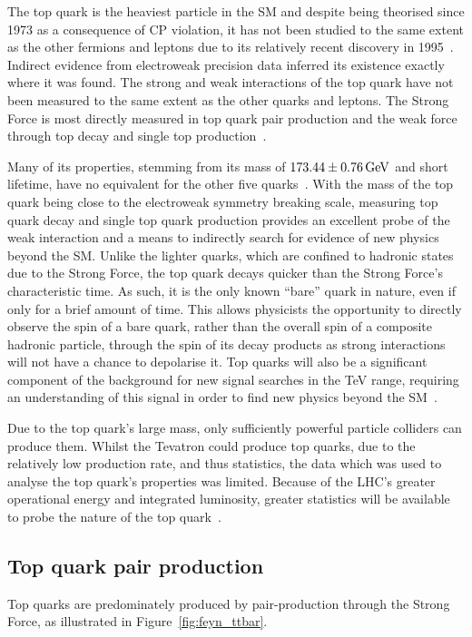 The top quark is the heaviest particle in the SM and despite being theorised since 1973 as a consequence of CP violation, it has not been studied to the same extent as the other fermions and leptons due to its relatively recent discovery in 1995~\cite{Quadt}. 
Indirect evidence from electroweak precision data inferred its existence exactly where it was found. 
The strong and weak interactions of the top quark have not been measured to the same extent as the other quarks and leptons.
The Strong Force is most directly measured in top quark pair production and the weak force through top decay and single top production~\cite{Quadt}. 

Many of its properties, stemming from its mass  of $173.44 \pm 0.76 \,\text{Ge\hspace{-.08em}V}$ and short lifetime, have no equivalent for the other five quarks~\cite{LHC:2014combination}. 
With the mass of the top quark being close to the electroweak symmetry breaking scale, measuring top quark decay and single top quark production provides an excellent probe of the weak interaction and a means to indirectly search for evidence of new physics beyond the SM. 
Unlike the lighter quarks, which are confined to hadronic states due to the Strong Force, the top quark decays quicker than the Strong Force's characteristic time.
As such, it is the only known ``bare'' quark in nature, even if only for a brief amount of time. 
This allows physicists the opportunity to directly observe the spin of a bare quark, rather than the overall spin of a composite hadronic particle, through the spin of its decay products as strong interactions will not have a chance to depolarise it.
Top quarks will also be a significant component of the background for new signal searches in the TeV range, requiring an understanding of this signal in order to find new physics beyond the SM~\cite{Quadt}.

Due to the top quark's large mass, only sufficiently powerful particle colliders can produce them. 
Whilst the Tevatron could produce top quarks, due to the relatively low production rate, and thus statistics, the data which was used to analyse the top quark's properties was limited.
Because of the LHC’s greater operational energy and integrated luminosity, greater statistics will be available to probe the nature of the top quark~\cite{Shibata:2008sy}. 

\subsection{Top quark pair production}\label{subsec:ttbarTheory}
Top quarks are predominately produced by pair-production through the Strong Force, as illustrated in Figure~\ref{fig:feyn_ttbar}.

